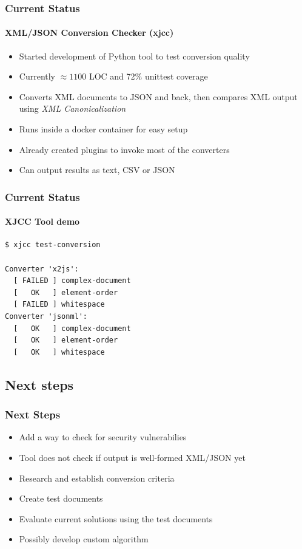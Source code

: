 \documentclass[
    alternativetitlepage=alternativ,
    cornerlogo=hgi_nds_logo2,
    sectionoverview,
]{rubpresentation}
\begin{document}
\begin{frame}
    \frametitle{Current Status}
    \framesubtitle{XML/JSON Conversion Checker (xjcc)}
    \begin{itemize}
        \item{} Started development of Python tool to test conversion quality
        \item{} Currently $\approx 1100$ LOC and 72\% unittest coverage
        \item{} Converts XML documents to JSON and back, then compares XML output using \emph{XML Canonicalization}
        \item{} Runs inside a docker container for easy setup
        \item{} Already created plugins to invoke most of the converters
        \item{} Can output results as text, CSV or JSON
    \end{itemize}
\end{frame}

\begin{frame}[fragile]
    \frametitle{Current Status}
    \framesubtitle{XJCC Tool demo}

    \begin{lstlisting}
$ xjcc test-conversion

Converter 'x2js':
  [ FAILED ] complex-document
  [   OK   ] element-order
  [ FAILED ] whitespace
Converter 'jsonml':
  [   OK   ] complex-document
  [   OK   ] element-order
  [   OK   ] whitespace
    \end{lstlisting}
\end{frame}

\subsection{Next steps}

\begin{frame}
    \frametitle{Next Steps}
    \begin{itemize}
        \item{} Add a way to check for security vulnerabilies
        \item{} Tool does not check if output is well-formed XML/JSON yet
        \item{} Research and establish conversion criteria
        \item{} Create test documents
        \item{} Evaluate current solutions using the test documents
        \item{} Possibly develop custom algorithm
    \end{itemize}
\end{frame}
\end{document}
